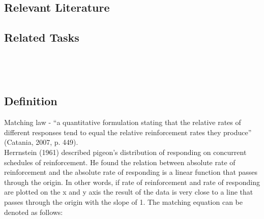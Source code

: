 \subsection{Relevant Literature}
\begin{refsection}
\nocite{test,alang2017police,clayton2018black}
\printbibliography[heading=none]
\end{refsection}
%
\subsection{Related Tasks}
\foureNine{}\\
\fourFKTen{}\\
%
%
%
%
%
%
\section{\fourFKFourty{}}
\subsection{Definition} 
Matching law - ``a quantitative formulation stating that the relative rates of different responses tend to equal the relative reinforcement rates they produce'' (Catania, 2007, p. 449).\\

Herrnstein (1961) described pigeon's distribution of responding on concurrent schedules of reinforcement. He found the relation between absolute rate of reinforcement and the absolute rate of responding is a linear function that passes through the origin. In other words, if rate of reinforcement and rate of responding are plotted on the x and y axis the result of the data is very close to a line that passes through the origin with the slope of 1. The matching equation can be denoted as follows:\\

